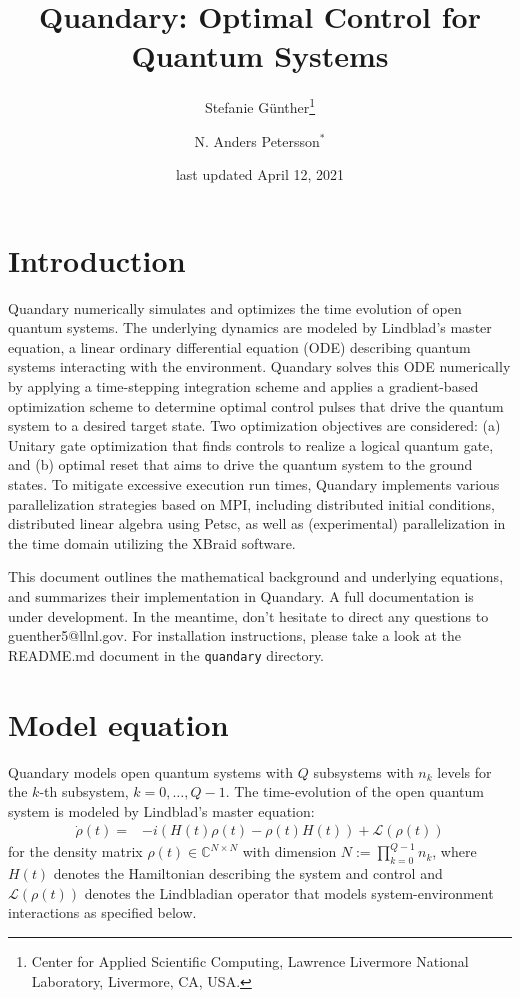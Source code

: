 \documentclass[11pt]{article}
\title{Quandary: Optimal Control for Quantum Systems}
\author{Stefanie G{\"u}nther\thanks{Center for Applied Scientific Computing, Lawrence Livermore
    National Laboratory, Livermore, CA, USA.} \and N. Anders Petersson$^*$}
\date{last updated April 12, 2021}
\newcommand{\Ell}{\mathcal{L}}
\newcommand{\C}{\mathds{C}}
\begin{document}
\maketitle


\section{Introduction}
Quandary numerically simulates and optimizes the time evolution of open quantum systems. The
underlying dynamics are modeled by Lindblad's master equation, a linear ordinary differential
equation (ODE) describing quantum systems interacting with the environment. Quandary solves this ODE
numerically by applying a time-stepping integration scheme and applies a gradient-based optimization
scheme to determine optimal control pulses that drive the quantum system to a desired target state.
Two optimization objectives are considered: (a) Unitary gate optimization that finds controls to
realize a logical quantum gate, and (b) optimal reset that aims to drive the quantum system to the
ground states.
To mitigate excessive execution run times, Quandary implements various parallelization strategies based on MPI, including distributed initial conditions, distributed linear algebra using Petsc, as well as (experimental) parallelization in the time domain utilizing the XBraid software.

This document outlines the mathematical background and underlying equations, and summarizes their
implementation in Quandary. A full documentation is under development. In the meantime, don't
hesitate to direct any questions to guenther5@llnl.gov. For installation instructions, please take a
look at the README.md document in the \verb+quandary+ directory.

\section{Model equation}
Quandary models open quantum systems with $Q$ subsystems with $n_k$ levels for the
$k$-th subsystem, $k=0,\dots,Q-1$. The time-evolution of the open quantum system is modeled by Lindblad's master equation:
\begin{align}\label{mastereq}
  \dot \rho(t) = &-i(H(t)\rho(t) - \rho(t)H(t)) + \Ell(\rho(t))
\end{align}
for the density matrix $\rho(t)\in \C^{N\times N}$ with dimension $N :=
\prod_{k=0}^{Q-1} n_k$, where $H(t)$ denotes the Hamiltonian describing the system and control and $\Ell(\rho(t))$ denotes the Lindbladian operator that models system-environment interactions as specified below.
\end{document}
